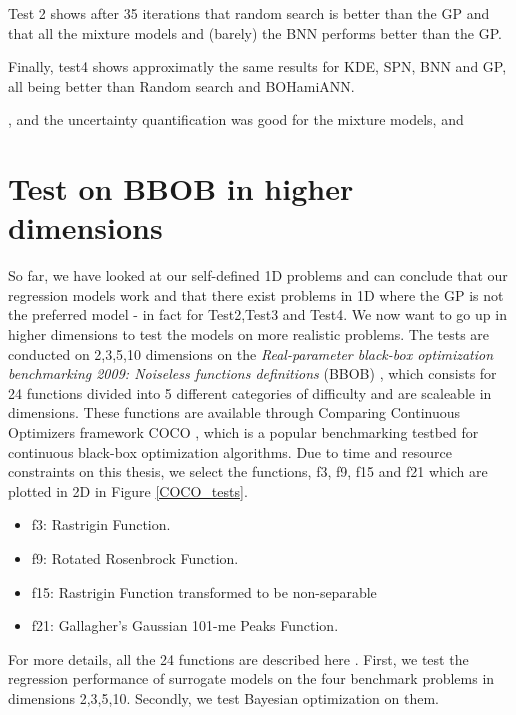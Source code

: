 Test 2 shows after 35 iterations that random search is better than the GP and that all the mixture models and (barely) the BNN 
performs better than the GP. 

Finally, test4 shows approximatly the same results for KDE, SPN, BNN and GP, all being better than Random 
search and BOHamiANN. 



, and the uncertainty quantification was good
for the mixture models, and

\section{Test on BBOB in higher dimensions}
So far, we have looked at our self-defined 1D problems and can conclude that our regression models
work and that there exist problems in 1D where the GP is not the preferred model - in fact for Test2,Test3
and Test4. We now want to go up in higher dimensions to test the models on more realistic problems.
The tests are conducted on 2,3,5,10 dimensions on the \textit{Real-parameter black-box optimization
benchmarking 2009: Noiseless functions definitions} (BBOB) \cite{hansen2009real}, which consists for
24 functions divided into 5 different categories of difficulty and are scaleable in dimensions.
These functions are available through Comparing Continuous Optimizers framework COCO \cite{COCO},
which is a popular benchmarking testbed for continuous black-box optimization algorithms. Due to
time and resource constraints on this thesis, we select the functions, f3, f9, f15 and f21 which are
plotted in 2D in Figure \ref{COCO_tests}.
\begin{itemize}[noitemsep]
  \item f3: Rastrigin Function.
  \item f9: Rotated Rosenbrock Function.
  \item f15: Rastrigin Function transformed to be non-separable
  \item f21: Gallagher’s Gaussian 101-me Peaks Function.
\end{itemize}
For more details, all the 24 functions are described here \cite{hansen2009real}. First, we test the
regression performance of surrogate models on the four benchmark problems in dimensions 2,3,5,10.
Secondly, we test Bayesian optimization on them. 

